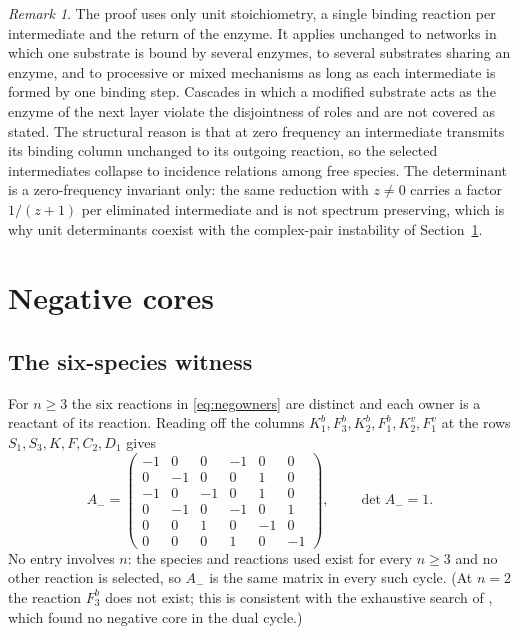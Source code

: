 \documentclass[11pt,a4paper]{article}
\theoremstyle{plain}
\theoremstyle{definition}
\theoremstyle{remark}
\newtheorem{remark}[theorem]{Remark}
\newcommand{\Aminus}{A_{-}}
\begin{document}
\begin{remark}
The proof uses only unit stoichiometry, a single binding reaction per intermediate and the return of the enzyme. It applies unchanged to networks in which one substrate is bound by several enzymes, to several substrates sharing an enzyme, and to processive or mixed mechanisms as long as each intermediate is formed by one binding step. Cascades in which a modified substrate acts as the enzyme of the next layer violate the disjointness of roles and are not covered as stated. The structural reason is that at zero frequency an intermediate transmits its binding column unchanged to its outgoing reaction, so the selected intermediates collapse to incidence relations among free species. The determinant is a zero-frequency invariant only: the same reduction with $z\neq0$ carries a factor $1/(z+1)$ per eliminated intermediate and is not spectrum preserving, which is why unit determinants coexist with the complex-pair instability of Section~\ref{sec:negative}.
\end{remark}

\section{Negative cores}\label{sec:negative}

\subsection{The six-species witness}
For $n\ge3$ the six reactions in \eqref{eq:negowners} are distinct and each owner is a reactant of its reaction. Reading off the columns $K_1^b,F_3^b,K_2^b,F_1^b,K_2^v,F_1^v$ at the rows $S_1,S_3,K,F,C_2,D_1$ gives
\begin{equation}\label{eq:Aminus}
\Aminus=\begin{pmatrix}
-1&0&0&-1&0&0\\
0&-1&0&0&1&0\\
-1&0&-1&0&1&0\\
0&-1&0&-1&0&1\\
0&0&1&0&-1&0\\
0&0&0&1&0&-1
\end{pmatrix},\qquad \det\Aminus=1 .
\end{equation}
No entry involves $n$: the species and reactions used exist for every $n\ge3$ and no other reaction is selected, so $\Aminus$ is the same matrix in every such cycle. (At $n=2$ the reaction $F_3^b$ does not exist; this is consistent with the exhaustive search of \citep{VassenaStadler2024}, which found no negative core in the dual cycle.)
\end{document}
